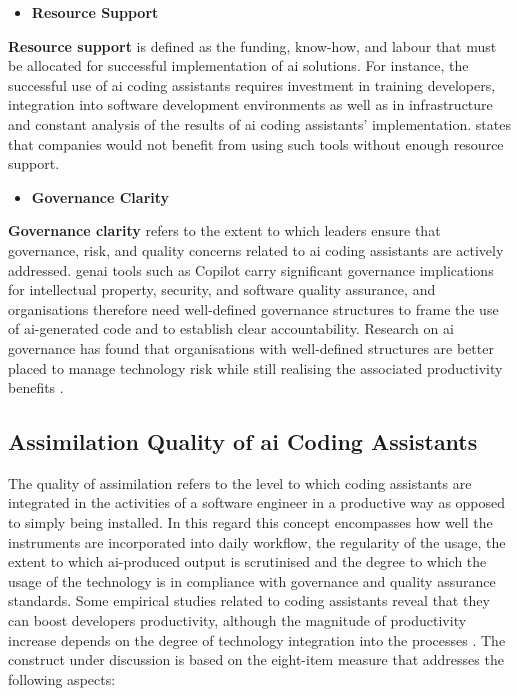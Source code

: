 \begin{itemize}
	\item \textbf{Resource Support}
\end{itemize}
\textbf{Resource support} is defined as the funding, know-how, and labour that must be allocated for successful implementation of \gls{ai} solutions. For instance, the successful use of \gls{ai} coding assistants requires investment in training developers, integration into software development environments as well as in infrastructure and constant analysis of the results of \gls{ai} coding assistants' implementation. \textcite{Babina2024} states that companies would not benefit from using such tools without enough resource support.

\begin{itemize}
	\item \textbf{Governance Clarity}
\end{itemize}
\textbf{Governance clarity} refers to the extent to which leaders ensure that governance, risk, and quality concerns related to \gls{ai} coding assistants are actively addressed. \gls{genai} tools such as Copilot carry significant governance implications for intellectual property, security, and software quality assurance, and organisations therefore need well-defined governance structures to frame the use of \gls{ai}-generated code and to establish clear accountability. Research on \gls{ai} governance has found that organisations with well-defined structures are better placed to manage technology risk while still realising the associated productivity benefits \autocite{Hradecky2022}.

\subsection{Assimilation Quality of \gls{ai} Coding Assistants}
\label{sec:Assimilation Quality of AI Coding Assistants}
The quality of assimilation refers to the level to which coding assistants are integrated in the activities of a software engineer in a productive way as opposed to simply being installed. In this regard this concept encompasses how well the instruments are incorporated into daily workflow, the regularity of the usage, the extent to which \gls{ai}-produced output is scrutinised and the degree to which the usage of the technology is in compliance with governance and quality assurance standards. Some empirical studies related to coding assistants reveal that they can boost developers productivity, although the magnitude of productivity increase depends on the degree of technology integration into the processes \autocite{Brynjolfsson2025}. The construct under discussion is based on the eight-item measure that addresses the following aspects:


